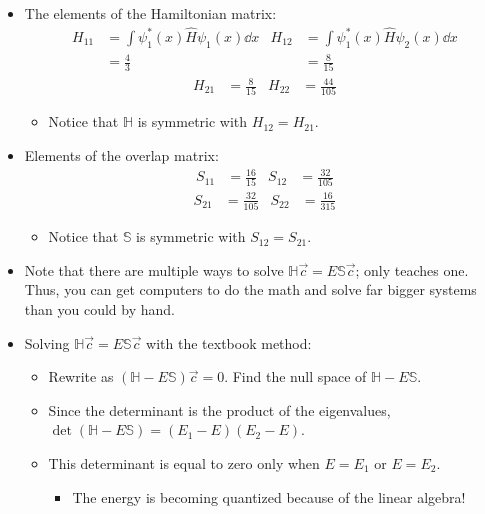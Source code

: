 \documentclass[../notes.tex]{subfiles}
\begin{document}
\begin{itemize}
\begin{itemize}
    \end{itemize}
    \item The elements of the Hamiltonian matrix:
    \begin{align*}
        H_{11} &= \int\psi_1^*(x)\hat{H}\psi_1(x)\dd{x}&
            H_{12} &= \int\psi_1^*(x)\hat{H}\psi_2(x)\dd{x}\\
        &= \frac{4}{3}&
            &= \frac{8}{15}
    \end{align*}
    \begin{align*}
        H_{21} &= \frac{8}{15}&
        H_{22} &= \frac{44}{105}
    \end{align*}
    \begin{itemize}
        \item Notice that $\mathbb{H}$ is symmetric with $H_{12}=H_{21}$.
    \end{itemize}
    \item Elements of the overlap matrix:
    \begin{align*}
        S_{11} &= \frac{16}{15}&
        S_{12} &= \frac{32}{105}
    \end{align*}
    \begin{align*}
        S_{21} &= \frac{32}{105}&
        S_{22} &= \frac{16}{315}
    \end{align*}
    \begin{itemize}
        \item Notice that $\mathbb{S}$ is symmetric with $S_{12}=S_{21}$.
    \end{itemize}
    \item Note that there are multiple ways to solve $\mathbb{H}\vec{c}=E\mathbb{S}\vec{c}$; \textcite{bib:McQuarrieSimon} only teaches one. Thus, you can get computers to do the math and solve far bigger systems than you could by hand.
    \item Solving $\mathbb{H}\vec{c}=E\mathbb{S}\vec{c}$ with the textbook method:
    \begin{itemize}
        \item Rewrite as $(\mathbb{H}-E\mathbb{S})\vec{c}=0$. Find the null space of $\mathbb{H}-E\mathbb{S}$.
        \item Since the determinant is the product of the eigenvalues, $\det(\mathbb{H}-E\mathbb{S})=(E_1-E)(E_2-E)$.
        \item This determinant is equal to zero only when $E=E_1$ or $E=E_2$.
        \begin{itemize}
            \item The energy is becoming quantized because of the linear algebra!

\end{itemize}
\end{itemize}
\end{itemize}
\end{document}
